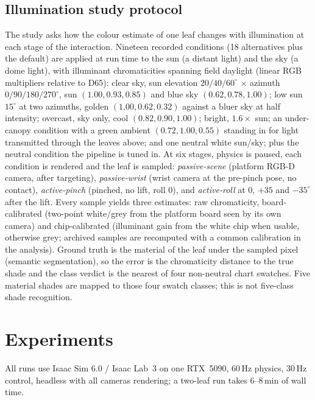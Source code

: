 \documentclass[letterpaper, 10 pt, conference]{ieeeconf}
\begin{document}
\subsection{Illumination study protocol}\label{sec:protocol}
The study asks how the colour estimate of one leaf changes with illumination at each stage
of the interaction. Nineteen recorded conditions (18 alternatives plus the default) are applied at run time to the sun (a distant light) and the sky (a
dome light), with illuminant chromaticities spanning field daylight (linear RGB
multipliers relative to D65): clear sky, sun elevation $20/40/60^\circ$ $\times$ azimuth
$0/90/180/270^\circ$, sun $(1.00,0.93,0.85)$ and blue sky $(0.62,0.78,1.00)$; low sun
$15^\circ$ at two azimuths, golden $(1.00,0.62,0.32)$ against a bluer sky at half
intensity; overcast, sky only, cool $(0.82,0.90,1.00)$; bright, $1.6\times$ sun; an
under-canopy condition with a green ambient $(0.72,1.00,0.55)$ standing in for light
transmitted through the leaves above; and one neutral white sun/sky; plus the neutral
condition the pipeline is tuned in. At
six stages, physics is paused, each condition is rendered and the leaf is sampled:
\emph{passive-scene} (platform RGB-D camera, after targeting), \emph{passive-wrist} (wrist
camera at the pre-pinch pose, no contact), \emph{active-pinch} (pinched, no lift, roll 0),
and \emph{active-roll} at $0$, $+35$ and $-35^\circ$ after the lift. Every sample yields
three estimates: raw chromaticity, board-calibrated (two-point white/grey from the platform
board seen by its own camera) and chip-calibrated (illuminant gain from the white chip
when usable, otherwise grey; archived samples are recomputed with a common calibration
in the analysis). Ground truth is the material of the leaf under the sampled pixel (semantic
segmentation), so the error is the chromaticity distance to the true shade and the class
verdict is the nearest of four non-neutral chart swatches. Five material shades are
mapped to those four swatch classes; this is not five-class shade recognition.

\section{Experiments}

All runs use Isaac Sim 6.0 / Isaac Lab~3 on one RTX~5090, 60\,Hz physics, 30\,Hz control,
headless with all cameras rendering; a two-leaf run takes 6--8\,min of wall time.
\end{document}
